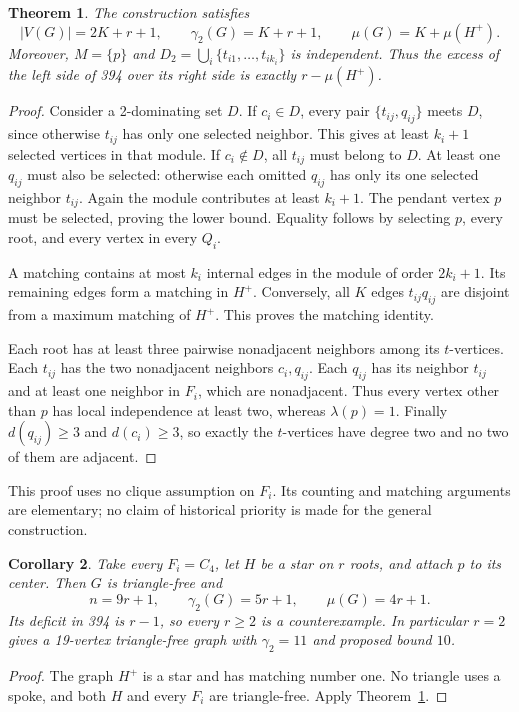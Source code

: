 \documentclass[11pt,a4paper]{article}
\newtheorem{theorem}{Theorem}[section]
\newtheorem{corollary}[theorem]{Corollary}
\theoremstyle{definition}\newtheorem{definition}[theorem]{Definition}
\theoremstyle{remark}\newtheorem{remark}[theorem]{Remark}
\begin{document}
\begin{theorem}\label{r11td:spokes}
The construction satisfies
\[
 |V(G)|=2K+r+1,\qquad
 \gamma_2(G)=K+r+1,\qquad
 \mu(G)=K+\mu(H^+).
\]
Moreover, $M=\{p\}$ and $D_2=\bigcup_i\{t_{i1},\ldots,t_{ik_i}\}$
is independent. Thus the excess of the left side of 394 over its
right side is exactly $r-\mu(H^+)$.
\end{theorem}
\begin{proof}
Consider a 2-dominating set $D$. If $c_i\in D$, every pair
$\{t_{ij},q_{ij}\}$ meets $D$, since otherwise $t_{ij}$ has only one
selected neighbor. This gives at least $k_i+1$ selected vertices in
that module. If $c_i\notin D$, all $t_{ij}$ must belong to $D$.
At least one $q_{ij}$ must also be selected: otherwise each omitted
$q_{ij}$ has only its one selected neighbor $t_{ij}$.
Again the module contributes at least $k_i+1$. The pendant vertex
$p$ must be selected, proving the lower bound. Equality follows by
selecting $p$, every root, and every vertex in every $Q_i$.

A matching contains at most $k_i$ internal edges in the module of
order $2k_i+1$. Its remaining edges form a matching in $H^+$.
Conversely, all $K$ edges $t_{ij}q_{ij}$ are disjoint from a maximum
matching of $H^+$. This proves the matching identity.

Each root has at least three pairwise nonadjacent neighbors among
its $t$-vertices. Each $t_{ij}$ has the two nonadjacent neighbors
$c_i,q_{ij}$. Each $q_{ij}$ has its neighbor $t_{ij}$ and at least one
neighbor in $F_i$, which are nonadjacent. Thus every vertex other than
$p$ has local independence at least two, whereas $\lambda(p)=1$.
Finally $d(q_{ij})\ge3$ and $d(c_i)\ge3$, so exactly the $t$-vertices
have degree two and no two of them are adjacent.
\end{proof}
This proof uses no clique assumption on $F_i$. Its counting and
matching arguments are elementary; no claim of historical priority is
made for the general construction.

\begin{corollary}\label{r11td:c4}
Take every $F_i=C_4$, let $H$ be a star on $r$ roots, and attach $p$
to its center. Then $G$ is triangle-free and
\[
 n=9r+1,\qquad \gamma_2(G)=5r+1,\qquad \mu(G)=4r+1.
\]
Its deficit in 394 is $r-1$, so every $r\ge2$ is a counterexample.
In particular $r=2$ gives a
19-vertex triangle-free graph with $\gamma_2=11$ and proposed bound $10$.
\end{corollary}
\begin{proof}
The graph $H^+$ is a star and has matching number one. No triangle
uses a spoke, and both $H$ and every $F_i$ are triangle-free.
Apply Theorem~\ref{r11td:spokes}.
\end{proof}
\end{document}
